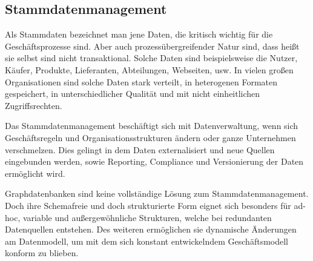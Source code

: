\subsection{Stammdatenmanagement}
Als Stammdaten bezeichnet man jene Daten, die kritisch wichtig für die Geschäftsprozesse sind. Aber auch prozessübergreifender Natur sind, dass heißt sie selbst sind nicht transaktional. Solche Daten sind beispielsweise die Nutzer, Käufer, Produkte, Lieferanten, Abteilungen, Webseiten, usw. In vielen großen Organisationen sind solche Daten stark verteilt, in heterogenen Formaten gespeichert, in unterschiedlicher Qualität und mit nicht einheitlichen Zugriffsrechten. 

Das Stammdatenmanagement beschäftigt sich mit Datenverwaltung, wenn sich Geschäftsregeln und Organisationsstrukturen ändern oder ganze Unternehmen verschmelzen. Dies gelingt in dem Daten externalisiert und neue Quellen eingebunden werden, sowie Reporting, Compliance und Versionierung der Daten ermöglicht wird. 

Graphdatenbanken sind keine vollständige Lösung zum Stammdatenmanagement. Doch ihre Schemafreie und doch strukturierte Form eignet sich besonders für ad-hoc, variable und außergewöhnliche Strukturen, welche bei redundanten Datenquellen entstehen. Des weiteren ermöglichen sie dynamische Änderungen am Datenmodell, um mit dem sich konstant entwickelndem Geschäftsmodell konform zu blieben.\cite[p.~110]{GraphDB}
